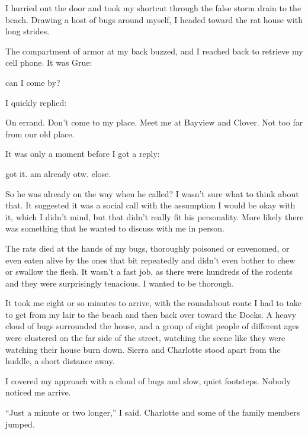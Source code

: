I hurried out the door and took my shortcut through the false storm drain to the beach.  Drawing a host of bugs around myself, I headed toward the rat house with long strides.



The compartment of armor at my back buzzed, and I reached back to retrieve my cell phone.  It was Grue:



can I come by?



I quickly replied:



On errand.  Don't come to my place.  Meet me at Bayview and Clover.  Not too far from our old place.



It was only a moment before I got a reply:



got it. am already otw.  close.



So he was already on the way when he called?  I wasn't sure what to think about that.  It suggested it was a social call with the assumption I would be okay with it, which I didn't mind, but that didn't really fit his personality.  More likely there was something that he wanted to discuss with me in person.



The rats died at the hands of my bugs, thoroughly poisoned or envenomed, or even eaten alive by the ones that bit repeatedly and didn't even bother to chew or swallow the flesh.  It wasn't a fast job, as there were hundreds of the rodents and they were surprisingly tenacious. I wanted to be thorough.



It took me eight or so minutes to arrive, with the roundabout route I had to take to get from my lair to the beach and then back over toward the Docks.  A heavy cloud of bugs surrounded the house, and a group of eight people of different ages were clustered on the far side of the street, watching the scene like they were watching their house burn down.  Sierra and Charlotte stood apart from the huddle, a short distance away.



I covered my approach with a cloud of bugs and slow, quiet footsteps.  Nobody noticed me arrive.



``Just a minute or two longer,'' I said.  Charlotte and some of the family members jumped.



